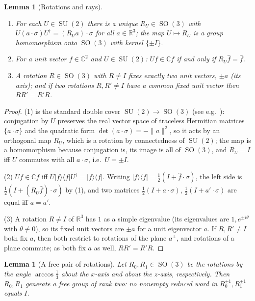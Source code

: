 \documentclass[11pt]{amsart}
\newtheorem{lemma}[theorem]{Lemma}
\theoremstyle{definition}
\theoremstyle{remark}
\newcommand{\R}{\mathbb{R}}
\newcommand{\C}{\mathbb{C}}
\DeclareMathOperator{\SO}{SO}
\DeclareMathOperator{\SU}{SU}
\begin{document}
\begin{lemma}[Rotations and rays]\label{lem:bloch}
\begin{enumerate}
\item For each $U\in\SU(2)$ there is a unique $R_U\in\SO(3)$ with
  $U(a\cdot\sigma)U^\dagger=(R_Ua)\cdot\sigma$ for all $a\in\R^3$;
  the map $U\mapsto R_U$ is a group homomorphism onto $\SO(3)$ with
  kernel $\{\pm I\}$.
\item For a unit vector $f\in\C^2$ and $U\in\SU(2)$: $Uf\in\C f$ if
  and only if $R_U\hat f=\hat f$.
\item A rotation $R\in\SO(3)$ with $R\ne I$ fixes exactly two unit
  vectors, $\pm a$ (its \emph{axis}); and if two rotations $R,R'\ne I$
  have a common fixed unit vector then $RR'=R'R$.
\end{enumerate}
\end{lemma}

\begin{proof}
(1) is the standard double cover $\SU(2)\to\SO(3)$ (see e.g.\
\cite[Ch.~2]{Wagon}): conjugation by $U$ preserves the real vector
space of traceless Hermitian matrices $\{a\cdot\sigma\}$ and the
quadratic form $\det(a\cdot\sigma)=-\|a\|^2$, so it acts by an
orthogonal map $R_U$, which is a rotation by connectedness of
$\SU(2)$; the map is a homomorphism because conjugation is, its image
is all of $\SO(3)$, and $R_U=I$ iff $U$ commutes with all
$a\cdot\sigma$, i.e.\ $U=\pm I$.

(2) $Uf\in\C f$ iff $U|f\rangle\langle f|U^\dagger=|f\rangle\langle
f|$. Writing $|f\rangle\langle f|=\frac12(I+\hat f\cdot\sigma)$, the
left side is $\frac12(I+(R_U\hat f)\cdot\sigma)$ by (1), and two
matrices $\frac12(I+a\cdot\sigma)$, $\frac12(I+a'\cdot\sigma)$ are
equal iff $a=a'$.

(3) A rotation $R\ne I$ of $\R^3$ has $1$ as a simple eigenvalue (its
eigenvalues are $1,e^{\pm i\theta}$ with $\theta\not\equiv0$), so its
fixed unit vectors are $\pm a$ for a unit eigenvector $a$. If $R,R'\ne
I$ both fix $a$, then both restrict to rotations of the plane
$a^\perp$, and rotations of a plane commute; as both fix $a$ as well,
$RR'=R'R$.
\end{proof}

\begin{lemma}[A free pair of rotations]\label{lem:free}
Let $R_0,R_1\in\SO(3)$ be the rotations by the angle $\arccos\frac13$
about the $x$-axis and about the $z$-axis, respectively. Then
$R_0,R_1$ generate a free group of rank two: no nonempty reduced word
in $R_0^{\pm1},R_1^{\pm1}$ equals $I$.
\end{lemma}
\end{document}
